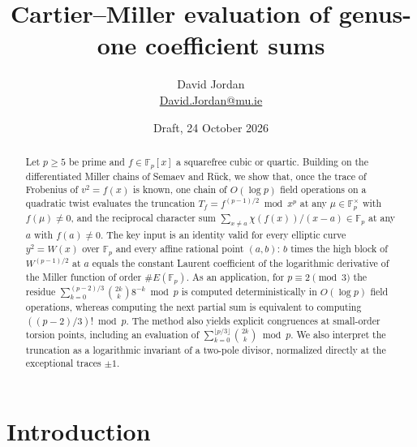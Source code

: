 \documentclass[11pt,a4paper]{article}
\title{Cartier--Miller evaluation of genus-one coefficient sums}
\author{David Jordan\\[2pt]\small\href{mailto:David.Jordan@mu.ie}{David.Jordan@mu.ie}}
\date{Draft, 24 October 2026}
\numberwithin{equation}{section}
\theoremstyle{plain}
\theoremstyle{definition}
\newcommand{\F}{\mathbb{F}}
\begin{document}
\maketitle

\begin{abstract}
Let $p\ge5$ be prime and $f\in\F_p[x]$ a squarefree cubic or quartic. Building on the differentiated Miller chains of Semaev and R\"uck, we show that, once the trace of Frobenius of $v^2=f(x)$ is known, one chain of $O(\log p)$ field operations on a quadratic twist evaluates the truncation $T_f=f^{(p-1)/2}\bmod x^p$ at any $\mu\in\F_p^\times$ with $f(\mu)\neq0$, and the reciprocal character sum $\sum_{x\neq a}\chi(f(x))/(x-a)\in\F_p$ at any $a$ with $f(a)\neq0$. The key input is an identity valid for every elliptic curve $y^2=W(x)$ over $\F_p$ and every affine rational point $(a,b)$: $b$ times the high block of $W^{(p-1)/2}$ at $a$ equals the constant Laurent coefficient of the logarithmic derivative of the Miller function of order $\#E(\F_p)$. As an application, for $p\equiv2\pmod3$ the residue $\sum_{k=0}^{(p-2)/3}\binom{2k}{k}8^{-k}\bmod p$ is computed deterministically in $O(\log p)$ field operations, whereas computing the next partial sum is equivalent to computing $((p-2)/3)!\bmod p$. The method also yields explicit congruences at small-order torsion points, including an evaluation of $\sum_{k=0}^{\lfloor p/3\rfloor}\binom{2k}{k}\bmod p$. We also interpret the truncation as a logarithmic invariant of a two-pole divisor, normalized directly at the exceptional traces $\pm1$.
\end{abstract}

\section{Introduction}\label{sec:intro}
\end{document}
